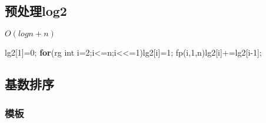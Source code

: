\documentclass[
]{article}
\newenvironment{Shaded}{}{}
\newcommand{\ControlFlowTok}[1]{\textcolor[rgb]{0.00,0.44,0.13}{\textbf{#1}}}
\newcommand{\DataTypeTok}[1]{\textcolor[rgb]{0.56,0.13,0.00}{#1}}
\newcommand{\DecValTok}[1]{\textcolor[rgb]{0.25,0.63,0.44}{#1}}
\newcommand{\NormalTok}[1]{#1}
\begin{document}
\hypertarget{ux9884ux5904ux7406log2}{%
\subsection{预处理log2}\label{ux9884ux5904ux7406log2}}

\(O(logn+n)\)

\begin{Shaded}
\begin{Highlighting}[]
\NormalTok{    lg2[}\DecValTok{1}\NormalTok{]=}\DecValTok{0}\NormalTok{;}
    \ControlFlowTok{for}\NormalTok{(rg }\DataTypeTok{int}\NormalTok{ i=}\DecValTok{2}\NormalTok{;i\textless{}=n;i\textless{}\textless{}=}\DecValTok{1}\NormalTok{)lg2[i]=}\DecValTok{1}\NormalTok{;}
\NormalTok{    fp(i,}\DecValTok{1}\NormalTok{,n)lg2[i]+=lg2[i{-}}\DecValTok{1}\NormalTok{];}
\end{Highlighting}
\end{Shaded}

\hypertarget{ux57faux6570ux6392ux5e8f}{%
\subsection{基数排序}\label{ux57faux6570ux6392ux5e8f}}

\hypertarget{ux6a21ux677f-16}{%
\subsubsection{模板}\label{ux6a21ux677f-16}}
\end{document}
